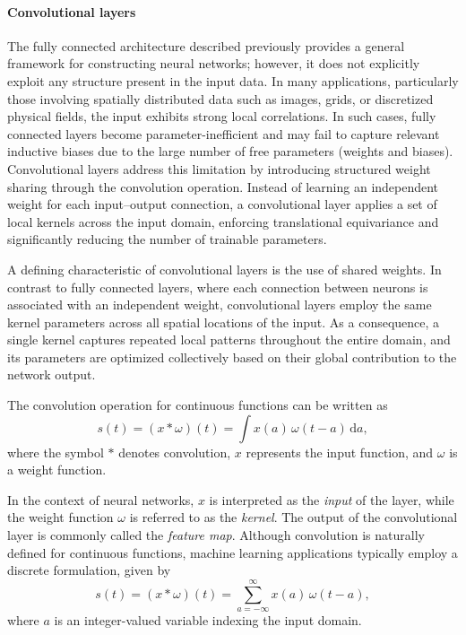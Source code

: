 \paragraph{Convolutional layers}
The fully connected architecture described previously provides a general framework for constructing neural networks; however, it does not explicitly exploit any structure present in the input data. In many applications, particularly those involving spatially distributed data such as images, grids, or discretized physical fields, the input exhibits strong local correlations. In such cases, fully connected layers become parameter-inefficient and may fail to capture relevant inductive biases due to the large number of free parameters (weights and biases). Convolutional layers address this limitation by introducing structured weight sharing through the convolution operation. Instead of learning an independent weight for each input--output connection, a convolutional layer applies a set of local kernels across the input domain, enforcing translational equivariance and significantly reducing the number of trainable parameters.

A defining characteristic of convolutional layers is the use of shared weights. In contrast to fully connected layers, where each connection between neurons is associated with an independent weight, convolutional layers employ the same kernel parameters across all spatial locations of the input. As a consequence, a single kernel captures repeated local patterns throughout the entire domain, and its parameters are optimized collectively based on their global contribution to the network output.

The convolution operation for continuous functions can be written as
\begin{equation}
    s(t) = (x * \omega)(t) = \int x(a)\,\omega(t - a)\,\mathrm{d}a,
\end{equation}
where the symbol $*$ denotes convolution, $x$ represents the input function, and $\omega$ is a weight function.

In the context of neural networks, $x$ is interpreted as the \emph{input} of the layer, while the weight function $\omega$ is referred to as the \emph{kernel}. The output of the convolutional layer is commonly called the \emph{feature map}. Although convolution is naturally defined for continuous functions, machine learning applications typically employ a discrete formulation, given by
\begin{equation}
    s(t) = (x * \omega)(t) = \sum_{a=-\infty}^{\infty} x(a)\,\omega(t - a),
\end{equation}
where $a$ is an integer-valued variable indexing the input domain.

